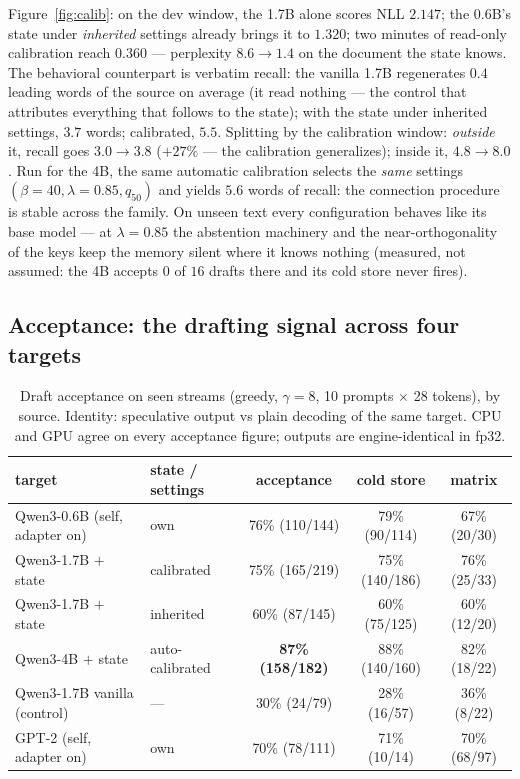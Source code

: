 \documentclass[11pt]{article}
\begin{document}
Figure~\ref{fig:calib}: on the dev window, the 1.7B alone scores NLL $2.147$; the 0.6B's state under \emph{inherited} settings already brings it to $1.320$; two minutes of read-only calibration reach $\mathbf{0.360}$ --- perplexity $8.6 \to 1.4$ on the document the state knows. The behavioral counterpart is verbatim recall: the vanilla 1.7B regenerates $0.4$ leading words of the source on average (it read nothing --- the control that attributes everything that follows to the state); with the state under inherited settings, $3.7$ words; calibrated, $5.5$. Splitting by the calibration window: \emph{outside} it, recall goes $3.0 \to 3.8$ ($+27\%$ --- the calibration generalizes); inside it, $4.8 \to 8.0$. Run for the 4B, the same automatic calibration selects the \emph{same} settings $(\beta{=}40, \lambda{=}0.85, q_{50})$ and yields $5.6$ words of recall: the connection procedure is stable across the family. On unseen text every configuration behaves like its base model --- at $\lambda = 0.85$ the abstention machinery and the near-orthogonality of the keys keep the memory silent where it knows nothing (measured, not assumed: the 4B accepts $0$ of $16$ drafts there and its cold store never fires).

\subsection{Acceptance: the drafting signal across four targets}\label{sec:drafter}

\begin{table}[t]
\centering\small
\caption{Draft acceptance on seen streams (greedy, $\gamma = 8$, 10 prompts $\times$ 28 tokens), by source. Identity: speculative output vs plain decoding of the same target. CPU and GPU agree on every acceptance figure; outputs are engine-identical in fp32.}
\label{tab:acc}
\begin{tabular}{@{}llccc@{}}
\toprule
target & state / settings & acceptance & cold store & matrix\\
\midrule
Qwen3-0.6B (self, adapter on) & own & 76\% (110/144) & 79\% (90/114) & 67\% (20/30)\\
Qwen3-1.7B $+$ state & calibrated & 75\% (165/219) & 75\% (140/186) & 76\% (25/33)\\
Qwen3-1.7B $+$ state & inherited & 60\% (87/145) & 60\% (75/125) & 60\% (12/20)\\
Qwen3-4B $+$ state & auto-calibrated & \textbf{87\% (158/182)} & 88\% (140/160) & 82\% (18/22)\\
Qwen3-1.7B vanilla (control) & --- & 30\% (24/79) & 28\% (16/57) & 36\% (8/22)\\
GPT-2 (self, adapter on) & own & 70\% (78/111) & 71\% (10/14) & 70\% (68/97)\\
\bottomrule
\end{tabular}
\end{table}
\end{document}
